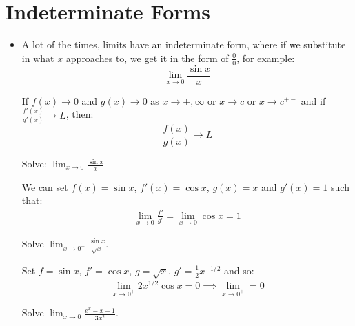 \section{Indeterminate Forms}
\begin{itemize}
    \item A lot of the times, limits have an indeterminate form, where if we substitute in what $x$ approaches to, we get it in the form of $\frac{0}{0}$, for example:
    \begin{equation}
        \lim_{x\to 0} \frac{\sin x}{x}
    \end{equation}
    \begin{theorem}
        If $f(x)\to 0$ and $g(x) \to 0$ as $x \to \pm, \infty$ or $x \to c$ or $x \to c^{+-}$ and if $\frac{f'(x)}{g'(x)} \to L$, then:
        \begin{equation}
            \frac{f(x)}{g(x)} \to L
        \end{equation}
    \end{theorem}
    \begin{example}
        Solve: $\lim_{x\to 0} \frac{\sin x}{x}$
        \vspace{2mm}

        We can set $f(x)=\sin x$, $f'(x) = \cos x$, $g(x)=x$ and $g'(x)=1$ such that:
        \begin{align}
            \lim_{x\to 0} \frac{f'}{g'}=\lim_{x\to 0}\cos x = 1
        \end{align}
    \end{example}
    \begin{example}
        Solve $\lim_{x\to 0^+} \frac{\sin x}{\sqrt{x}}$.
        \vspace{2mm}

        Set $f=\sin x$, $f'=\cos x$, $g=\sqrt{x}$, $g'=\frac{1}{2}x^{-1/2}$ and so:
        \begin{equation}
            \lim_{x\to 0^+} 2x^{1/2}\cos x = 0 \implies \lim_{x \to 0^+} = 0
        \end{equation}
    \end{example}
    \begin{example}
        Solve $\lim_{x\to 0} \frac{e^x-x-1}{3x^2}$.
        \vspace{2mm}


\end{example}
\end{itemize}
